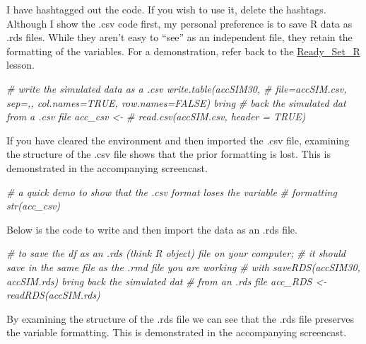 \documentclass[
  11pt,
]{book}
\newenvironment{Shaded}{\begin{snugshade}}{\end{snugshade}}
\newcommand{\CommentTok}[1]{\textcolor[rgb]{0.37,0.37,0.37}{\textit{#1}}}
\begin{document}
I have hashtagged out the code. If you wish to use it, delete the hashtags. Although I show the .csv code first, my personal preference is to save R data as .rds files. While they aren't easy to ``see'' as an independent file, they retain the formatting of the variables. For a demonstration, refer back to the \protect\hyperlink{Ready}{Ready\_Set\_R} lesson.

\begin{Shaded}
\begin{Highlighting}[]
\CommentTok{\# write the simulated data as a .csv write.table(accSIM30,}
\CommentTok{\# file=\textquotesingle{}accSIM.csv\textquotesingle{}, sep=\textquotesingle{},\textquotesingle{}, col.names=TRUE, row.names=FALSE) bring}
\CommentTok{\# back the simulated dat from a .csv file acc\_csv \textless{}{-}}
\CommentTok{\# read.csv(\textquotesingle{}accSIM.csv\textquotesingle{}, header = TRUE)}
\end{Highlighting}
\end{Shaded}

If you have cleared the environment and then imported the .csv file, examining the structure of the .csv file shows that the prior formatting is lost. This is demonstrated in the accompanying screencast.

\begin{Shaded}
\begin{Highlighting}[]
\CommentTok{\# a quick demo to show that the .csv format loses the variable}
\CommentTok{\# formatting str(acc\_csv)}
\end{Highlighting}
\end{Shaded}

Below is the code to write and then import the data as an .rds file.

\begin{Shaded}
\begin{Highlighting}[]
\CommentTok{\# to save the df as an .rds (think \textquotesingle{}R object\textquotesingle{}) file on your computer;}
\CommentTok{\# it should save in the same file as the .rmd file you are working}
\CommentTok{\# with saveRDS(accSIM30, \textquotesingle{}accSIM.rds\textquotesingle{}) bring back the simulated dat}
\CommentTok{\# from an .rds file acc\_RDS \textless{}{-} readRDS(\textquotesingle{}accSIM.rds\textquotesingle{})}
\end{Highlighting}
\end{Shaded}

By examining the structure of the .rds file we can see that the .rds file preserves the variable formatting. This is demonstrated in the accompanying screencast.
\end{document}
